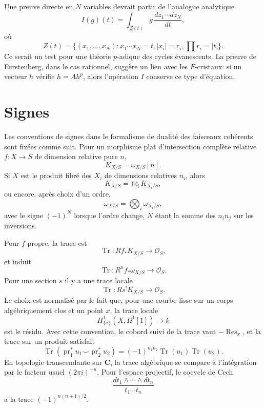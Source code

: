 \documentclass[11pt]{article}
\DeclareMathOperator{\Res}{Res}
\DeclareMathOperator{\Tr}{Tr}
\newcommand{\OO}{\mathcal O}
\newcommand{\C}{\mathbf C}
\begin{document}
Une preuve directe en $N$ variables devrait partir de l'analogue analytique
\begin{equation}\tag{1'}
 I(g)(t)=\int_{Z(t)} g\,\frac{dz_1\cdots dz_N}{dt},
\end{equation}
où
\[
 Z(t)=\{(x_1,
\ldots,x_N):x_1\cdots x_N=t,
 |x_i|=r_i,
 \prod r_i=|t|\}.
\]
Ce serait un test pour une théorie $p$-adique des cycles évanescents. La preuve de Furstenberg, dans le cas rationnel, suggère un lien avec les $F$-cristaux: si un vecteur $h$ vérifie $h=Ah^p$, alors l'opération $I$ conserve ce type d'équation.

\appendix
\section{Signes}

Les conventions de signes dans le formalisme de dualité des faisceaux cohérents sont fixées comme suit. Pour un morphisme plat d'intersection complète relative $f:X\to S$ de dimension relative pure $n$,
\begin{equation}\tag{S.1}
 K_{X/S}=\omega_{X/S}[n].
\end{equation}
Si $X$ est le produit fibré des $X_i$ de dimensions relatives $n_i$, alors
\begin{equation}\tag{S.2}
 K_{X/S}=\boxtimes_i K_{X_i/S},
\end{equation}
ou encore, après choix d'un ordre,
\begin{equation}\tag{S.3}
 \omega_{X/S}=\bigotimes_i\omega_{X_i/S},
\end{equation}
avec le signe $(-1)^N$ lorsque l'ordre change, $N$ étant la somme des $n_in_j$ sur les inversions.

Pour $f$ propre, la trace est
\begin{equation}\tag{S.4}
 \Tr:Rf_*K_{X/S}\to\OO_S,
\end{equation}
et induit
\begin{equation}\tag{S.5}
 \Tr:R^nf_*\omega_{X/S}\to\OO_S.
\end{equation}
Pour une section $s$ il y a une trace locale
\begin{equation}\tag{S.6}
 \Tr:Rs^!K_{X/S}\to\OO_S.
\end{equation}
Le choix est normalisé par le fait que, pour une courbe lisse sur un corps algébriquement clos et un point $x$, la trace locale
\begin{equation}\tag{S.7}
 H^1_{\{x\}}(X,\Omega^1[1])\to k
\end{equation}
est le résidu. Avec cette convention, le cobord suivi de la trace vaut $-\Res_x$, et la trace sur un produit satisfait
\[
 \Tr(\operatorname{pr}_1^*u_1\smile\operatorname{pr}_2^*u_2)=(-1)^{n_1n_2}\Tr(u_1)\Tr(u_2).
\]
En topologie transcendante sur $\C$, la trace algébrique se compare à l'intégration par le facteur usuel $(2\pi i)^{-n}$. Pour l'espace projectif, le cocycle de Cech
\[
 \frac{dt_1\wedge\cdots\wedge dt_n}{t_1\cdots t_n}
\]
a la trace $(-1)^{n(n+1)/2}$.
\end{document}
